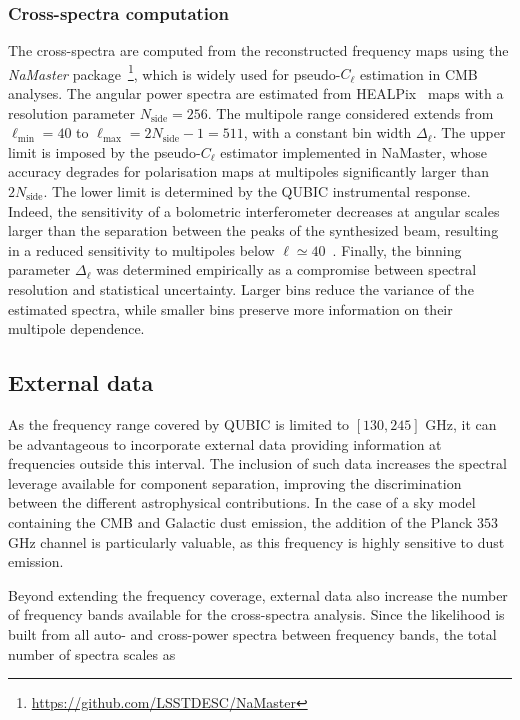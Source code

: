 \documentclass[../../thesis.tex]{subfiles}
\begin{document}
\subsubsection{Cross-spectra computation}

The cross-spectra are computed from the reconstructed frequency maps using the \emph{NaMaster} package~\cite{alonso2019}\footnote{\url{https://github.com/LSSTDESC/NaMaster}}, which is widely used for pseudo-$C_\ell$ estimation in CMB analyses. The angular power spectra are estimated from HEALPix~\cite{healpix2005} maps with a resolution parameter $N_{\mathrm{side}} = 256$.
The multipole range considered extends from $\ell_{\mathrm{min}} = 40$ to $\ell_{\mathrm{max}} = 2N_{\mathrm{side}} - 1 = 511$, with a constant bin width $\Delta_\ell$. The upper limit is imposed by the pseudo-$C_\ell$ estimator implemented in NaMaster, whose accuracy degrades for polarisation maps at multipoles significantly larger than $2N_{\mathrm{side}}$. The lower limit is determined by the QUBIC instrumental response. Indeed, the sensitivity of a bolometric interferometer decreases at angular scales larger than the separation between the peaks of the synthesized beam, resulting in a reduced sensitivity to multipoles below $\ell \simeq 40$~\cite{QUBICI}. Finally, the binning parameter $\Delta_\ell$ was determined empirically as a compromise between spectral resolution and statistical uncertainty. Larger bins reduce the variance of the estimated spectra, while smaller bins preserve more information on their multipole dependence.

\subsection{External data}

As the frequency range covered by QUBIC is limited to $\left[130,245\right]$ GHz, it can be advantageous to incorporate external data providing information at frequencies outside this interval. The inclusion of such data increases the spectral leverage available for component separation, improving the discrimination between the different astrophysical contributions. In the case of a sky model containing the CMB and Galactic dust emission, the addition of the Planck $353$ GHz channel is particularly valuable, as this frequency is highly sensitive to dust emission.

Beyond extending the frequency coverage, external data also increase the number of frequency bands available for the cross-spectra analysis. Since the likelihood is built from all auto- and cross-power spectra between frequency bands, the total number of spectra scales as
\end{document}
